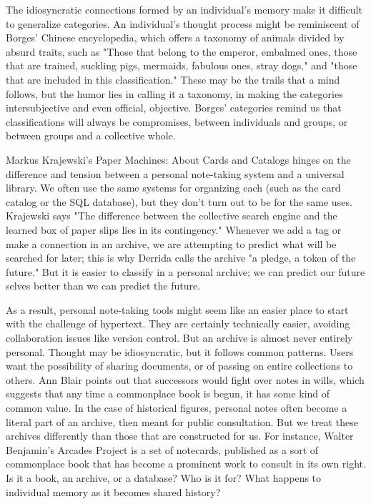 The idiosyncratic connections formed by an individual's memory make it difficult to generalize categories. An individual's thought process might be reminiscent of Borges' Chinese encyclopedia, which offers a taxonomy of animals divided by absurd traits, such as "Those that belong to the emperor, embalmed ones, those that are trained, suckling pigs, mermaids, fabulous ones, stray dogs," and "those that are included in this classification."  These may be the trails that a mind follows, but the humor lies in calling it a taxonomy, in making the categories intersubjective and even official, objective. Borges' categories remind us that classifications will always be compromises, between individuals and groups, or between groups and a collective whole.

Markus Krajewski's Paper Machines: About Cards and Catalogs hinges on the difference and tension between a personal note-taking system and a universal library. We often use the same systems for organizing each (such as the card catalog or the SQL database), but they don't turn out to be for the same uses. Krajewski says "The difference between the collective search engine and the learned box of paper slips lies in its contingency."  Whenever we add a tag or make a connection in an archive, we are attempting to predict what will be searched for later; this is why Derrida calls the archive "a pledge, a token of the future."  But it is easier to classify in a personal archive; we can predict our future selves better than we can predict the future.

As a result, personal note-taking tools might seem like an easier place to start with the challenge of hypertext. They are certainly technically easier, avoiding collaboration issues like version control. But an archive is almost never entirely personal. Thought may be idiosyncratic, but it follows common patterns. Users want the possibility of sharing documents, or of passing on entire collections to others. Ann Blair points out that successors would fight over notes in wills, which suggests that any time a commonplace book is begun, it has some kind of common value.  In the case of historical figures, personal notes often become a literal part of an archive, then meant for public consultation. But we treat these archives differently than those that are constructed for us. For instance, Walter Benjamin's Arcades Project is a set of notecards, published as a sort of commonplace book that has become a prominent work to consult in its own right. Is it a book, an archive, or a database? Who is it for? What happens to individual memory as it becomes shared history?

